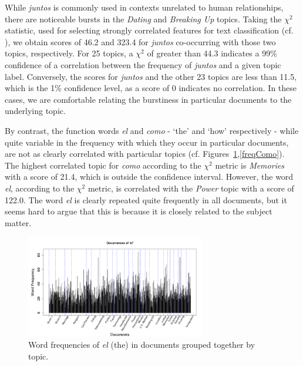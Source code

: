 While \textit{juntos} is commonly used in contexts unrelated to human relationships, there are noticeable bursts in the \textit{Dating} and \textit{Breaking Up} topics.  Taking the $\chi^2$ statistic, used for selecting strongly correlated features for text classification (cf. \cite{yang1997}), we obtain scores of 46.2 and 323.4 for \textit{juntos} co-occurring with those two topics, respectively.  For 25 topics, a $\chi^2$ of greater than 44.3 indicates a 99\% confidence of a correlation between the frequency of \textit{juntos} and a given topic label.  Conversely, the scores for \textit{juntos} and the other 23 topics are less than 11.5, which is the 1\% confidence level, as a score of 0 indicates no correlation.  In these cases, we are comfortable relating the burstiness in particular documents to the underlying topic.

By contrast, the function words \textit{el} and \textit{como} - `the' and `how' respectively - while quite variable in the frequency with which they occur in particular documents, are not as clearly correlated with particular topics (cf. Figures~\ref{freqEl},\ref{freqComo}).  The highest correlated topic for \textit{como} according to the $\chi^2$ metric is \textit{Memories} with a score of 21.4, which is outside the confidence interval.  However, the word \textit{el}, according to the $\chi^2$ metric, is correlated with the \textit{Power} topic with a score of 122.0.   The word \textit{el} is clearly repeated quite frequently in all documents, but it seems hard to argue that this is because it is closely related to the subject matter.

\begin{figure}
\begin{center}
\includegraphics[width=0.7\textwidth]{graphs/freq-el.png}
\caption[Word frequencies of \textit{el} by topic]{Word frequencies of \textit{el} (the) in documents grouped together by topic.\label{freqEl}}
\end{center}
\end{figure}

